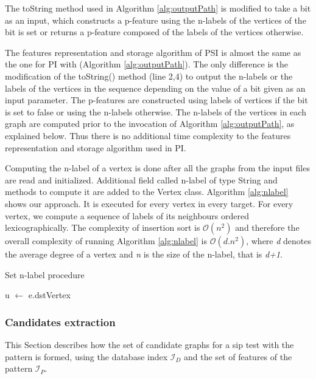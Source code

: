 \documentclass{l4proj}
\newcommand{\fancyI}{\mathcal{I}}
\begin{document}
The toString method used in Algorithm \ref{alg:outputPath} is modified to take a bit as an input, which constructs a p-feature using the n-labels of the vertices of the bit is set or returns a p-feature composed of the labels of the vertices otherwise.

The features representation and storage algorithm of PSI is almost the same as the one for PI with (Algorithm \ref{alg:outputPath}). The only difference is the modification of the toString() method (line 2,4) to output the n-labels or the labels of the vertices in the sequence depending on the value of a bit given as an input parameter. The p-features are constructed using labels of vertices if the bit is set to false or using the n-labels otherwise. The n-labels of the vertices in each graph are computed prior to the invocation of Algorithm \ref{alg:outputPath}, as explained below. Thus there is no additional time complexity to the features representation and storage algorithm used in PI.

Computing the n-label of a vertex is done after all the graphs from the input files are read and initialized. Additional field called n-label of type String and methods to compute it are added to the Vertex class. Algorithm \ref{alg:nlabel} shows our approach. It is executed for every vertex in every target. For every vertex, we compute a sequence of labels of its neighbours ordered lexicographically. The complexity of insertion sort is $\mathcal{O}(n^{2})$ \cite{backtracking-algorithms} and therefore the overall complexity of running Algorithm \ref{alg:nlabel} is $\mathcal{O}(d.n^{2})$, where \emph{d} denotes the average degree of a vertex and \emph{n} is the size of the n-label, that is \emph{d+1}.
 
\begin{algorithm}
\centering
\caption{Set n-label procedure}
\label{alg:nlabel}
\begin{algorithmic}[1]
\State u $\gets$ e.dstVertex
\State {} 
\EndFor
\EndProcedure
{} 
\end{algorithmic}
\end{algorithm}

\subsubsection{Candidates extraction}
\label{pi:candExtr}
This Section describes how the set of candidate graphs for a \gls{sip} test with the pattern is formed, using the database index $\fancyI_{D}$ and the set of features of the pattern $\fancyI_{P}$.
\end{document}

